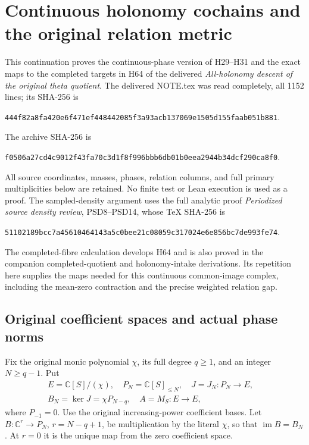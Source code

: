 \begingroup
\def\C{\mathbb C}
\def\R{\mathbb R}
\def\av{\operatorname{av}}
\def\im{\operatorname{im}}
\section{Continuous holonomy cochains and the original relation metric}



This continuation proves the continuous-phase version of H29--H31
and the exact maps to the completed targets in H64 of the delivered
\emph{All-holonomy descent of the original theta quotient}.
The delivered NOTE.tex was read completely, all 1152 lines;
its SHA-256 is
\begin{center}\small
\texttt{444f82a8fa420e6f471ef448442085f3a93acb137069e1505d155faab051b881}.
\end{center}
The archive SHA-256 is
\begin{center}\small
\texttt{f0506a27cd4c9012f43fa70c3d1f8f996bbb6db01b0eea2944b34dcf290ca8f0}.
\end{center}
All source coordinates, masses, phases, relation columns, and full
primary multiplicities below are retained. No finite test or Lean
execution is used as a proof.
The sampled-density argument uses the full analytic proof
\emph{Periodized source density review}, PSD8--PSD14,
whose TeX SHA-256 is
\begin{center}\small
\texttt{51102189bcc7a45610464143a5c0bee21c08059c317024e6e856bc7de993fe74}.
\end{center}
The completed-fibre calculation develops H64 and is also proved
in the companion completed-quotient and holonomy-intake derivations.
Its repetition here supplies the maps needed for this continuous
common-image complex, including the mean-zero contraction and
the precise weighted relation gap.

\subsection{Original coefficient spaces and actual phase norms}

Fix the original monic polynomial $\chi$, its full degree $q\ge1$,
and an integer $N\ge q-1$. Put
\[
 \begin{gathered}
 E=\C[S]/(\chi),\quad P_N=\C[S]_{\le N},\quad
 J=J_N:P_N\longrightarrow E,\quad\\
 B_N=\ker J=\chi P_{N-q},\quad A=M_S:E\longrightarrow E,
 \end{gathered}
 \tag{HCD1}
\]
where $P_{-1}=0$. Use the original increasing-power coefficient
bases. Let $B:\C^r\to P_N$, $r=N-q+1$, be multiplication by
the literal $\chi$, so that $\im B=B_N$. At $r=0$ it is the
unique map from the zero coefficient space.

